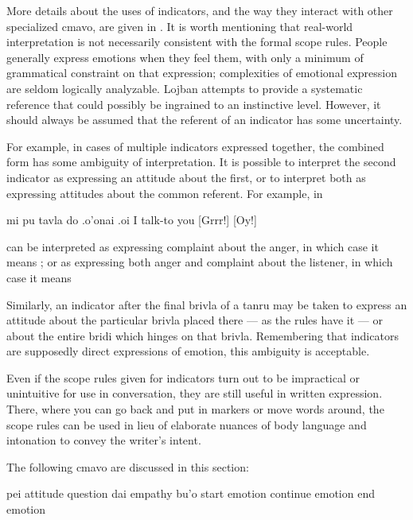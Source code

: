 More details about the uses of indicators, and the way they
    interact with other specialized cmavo, are given in . It is worth mentioning that
    real-world interpretation is not necessarily consistent with
    the formal scope rules. People generally express emotions when
    they feel them, with only a minimum of grammatical constraint
    on that expression; complexities of emotional expression are
    seldom logically analyzable. Lojban attempts to provide a
    systematic reference that could possibly be ingrained to an
    instinctive level. However, it should always be assumed that
    the referent of an indicator has some uncertainty.

For example, in cases of multiple indicators expressed
    together, the combined form has some ambiguity of
    interpretation. It is possible to interpret the second
    indicator as expressing an attitude about the first, or to
    interpret both as expressing attitudes about the common
    referent. For example, in
\begin{example}
mi pu tavla do .o'onai .oi\n
I  talk-to you [Grrr!] [Oy!]
\end{example}

{\noindent}can be interpreted as expressing complaint about the anger, in
    which case it means ; or as
    expressing both anger and complaint about the listener, in
    which case it means  

Similarly, an indicator after the final brivla of a tanru
    may be taken to express an attitude about the particular brivla
    placed there --- as the rules have it --- or about the entire
    bridi which hinges on that brivla. Remembering that indicators
    are supposedly direct expressions of emotion, this ambiguity is
    acceptable.

Even if the scope rules given for indicators turn out to be
    impractical or unintuitive for use in conversation, they are
    still useful in written expression. There, where you can go
    back and put in markers or move words around, the scope rules
    can be used in lieu of elaborate nuances of body language and
    intonation to convey the writer's intent.



The following cmavo are discussed in this section:

   pei attitude question
    dai empathy
    bu'o    start emotion   continue emotion end emotion

